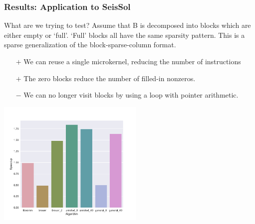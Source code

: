 \documentclass[9pt]{beamer}
\begin{document}
\begin{frame}[fragile]
  \frametitle{Results: Application to SeisSol}

  What are we trying to test? 
  Assume that B is decomposed into blocks which are either empty or `full'. `Full' blocks all have the same sparsity pattern. This is a sparse generalization of the block-sparse-column format.

  \begin{itemize}
  \item[$+$] We can reuse a single microkernel, reducing the number of instructions
  \item[$+$] The zero blocks reduce the number of filled-in nonzeros.
  \item[$-$] We can no longer visit blocks by using a loop with pointer arithmetic.
  \end{itemize}

  \centering
  \includegraphics[height=6cm]{images/seissol_comparison.pdf}

\end{frame}
\end{document}
